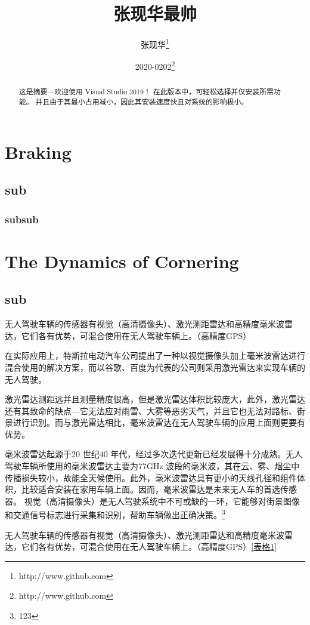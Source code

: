 \documentclass[12pt,oneside,a4paper]{ctexart}
\begin{document}
	\title{张现华最帅}
	\author{张现华\thanks{http://www.github.com}}
	\date{2020-0202\thanks{http://www.github.com}}	
	\maketitle
	\newpage
	
	\begin{abstract}
		这是摘要---欢迎使用 Visual Studio 2019！ 在此版本中，可轻松选择并仅安装所需功能。 并且由于其最小占用减小，因此其安装速度快且对系统的影响极小。
	\end{abstract}


	\tableofcontents
	
	\section{Braking}
		\subsection{sub}
			\subsubsection{subsub}
	\section[Cornering]{The Dynamics of Cornering}
		\subsection{sub}
\noindent 无人驾驶车辆的传感器有视觉（高清摄像头）、激光测距雷达和高精度毫米波雷达，它们各有优势，可混合使用在无人驾驶车辆上。（高精度GPS）\par
在实际应用上，特斯拉电动汽车公司提出了一种以视觉摄像头加上毫米波雷达进行混合使用的解决方案，而以谷歌、百度为代表的公司则采用激光雷达来实现车辆的无人驾驶。\par
激光雷达测距远并且测量精度很高，但是激光雷达体积比较庞大，此外，激光雷达还有其致命的缺点—它无法应对雨雪、大雾等恶劣天气，并且它也无法对路标、街景进行识别。而与激光雷达相比，毫米波雷达在无人驾驶车辆的应用上面则更要有优势。 \par
毫米波雷达起源于20 世纪40 年代，经过多次迭代更新已经发展得十分成熟。无人驾驶车辆所使用的毫米波雷达主要为77GHz 波段的毫米波，其在云、雾、烟尘中传播损失较小，故能全天候使用。此外，毫米波雷达具有更小的天线孔径和组件体积，比较适合安装在家用车辆上面。因而，毫米波雷达是未来无人车的首选传感器。
视觉（高清摄像头）是无人驾驶系统中不可或缺的一环，它能够对街景图像和交通信号标志进行采集和识别，帮助车辆做出正确决策。\footnote{123}\par
无人驾驶车辆的传感器有视觉（高清摄像头）、激光测距雷达和高精度毫米波雷达，它们各有优势，可混合使用在无人驾驶车辆上。（高精度GPS）\ref{表格1}\par
\end{document}
